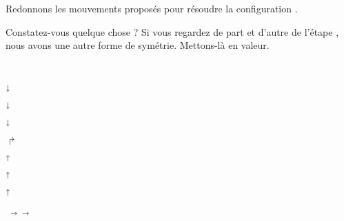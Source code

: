 Redonnons les mouvements proposés pour résoudre la configuration .
\begin{mvts}
    \medskip
    \item  {}

    \medskip
    \item  {}

    \medskip
    \item  {}

    \medskip
    \item  {}

    \medskip
    \item  {}

    \medskip
    \item  {}

    \medskip
    \item  {}

    \medskip
    \item  {}

    \medskip
    \item  {}
\end{mvts}


Constatez-vous quelque chose ? Si vous regardez de part et d'autre de l'étape , nous avons une autre forme de symétrie. Mettons-là en valeur.
\begin{multicols}{2}
    \medskip {}
     \,\,\,\,

    \medskip {}
     \quad $\shortdownarrow$

    \medskip {}
     \quad $\shortdownarrow$

    \medskip {}
     \quad $\shortdownarrow$


    \medskip \hfill{} $\Rsh$ \quad {}

    \medskip \hfill{} $\shortuparrow$ \quad {}

    \medskip \hfill{} $\shortuparrow$ \quad {}

    \medskip \hfill{} $\shortuparrow$ \quad {}
\end{multicols}
\vspace{-1em}
\begin{center}
    \medskip {} \, $\shortrightarrow$ \quad {}
     \quad $\shortrightarrow$ \, 
\end{center}

